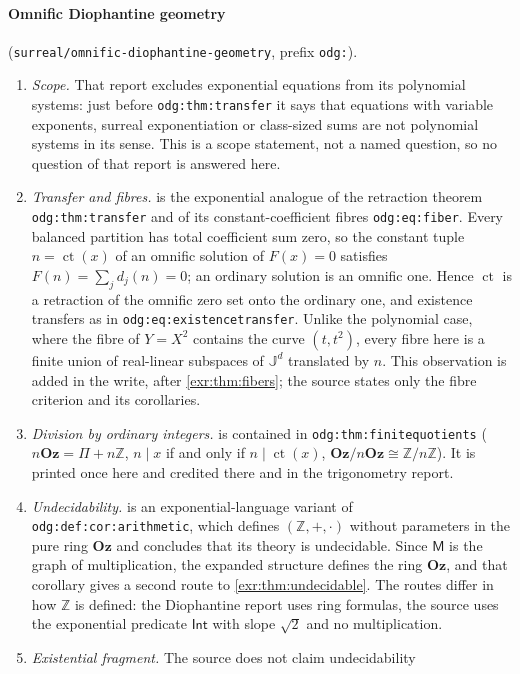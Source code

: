 \documentclass[11pt,letterpaper]{article}
\numberwithin{equation}{section}
\theoremstyle{definition}
\theoremstyle{remark}
\newcommand{\Oz}{\mathbf{Oz}}
\newcommand{\Z}{\mathbb Z}
\newcommand{\J}{\mathbb J}
\newcommand{\ct}{\operatorname{ct}}
\newcommand{\Int}{\mathsf{Int}}
\newcommand{\rpath}[1]{\nolinkurl{#1}}%
\newcommand{\lbl}[1]{\nolinkurl{#1}}%
\begin{document}
\paragraph{Omnific Diophantine geometry}
(\rpath{surreal/omnific-diophantine-geometry}, prefix \texttt{odg:}).
\begin{enumerate}[leftmargin=*,itemsep=3pt]
\item \emph{Scope.} That report excludes exponential equations from its
polynomial systems: just before \lbl{odg:thm:transfer} it says that equations
with variable exponents, surreal exponentiation or class-sized sums are not
polynomial systems in its sense. This is a scope statement, not a named
question, so no question of that report is answered here.
\item \emph{Transfer and fibres.}  is the exponential
analogue of the retraction theorem \lbl{odg:thm:transfer} and of its
constant-coefficient fibres \lbl{odg:eq:fiber}. Every balanced partition has
total coefficient sum zero, so the constant tuple $n=\ct(x)$ of an omnific
solution of $F(x)=0$ satisfies $F(n)=\sum_jd_j(n)=0$; an ordinary solution is
an omnific one. Hence $\ct$ is a retraction of the omnific zero set onto the
ordinary one, and existence transfers as in \lbl{odg:eq:existencetransfer}.
Unlike the polynomial case, where the fibre of $Y=X^2$ contains the curve
$(t,t^2)$, every fibre here is a finite union of real-linear subspaces of
$\J^d$ translated by $n$. This observation is added in the write, after
\cref{exr:thm:fibers}; the source states only the fibre criterion and its
corollaries.
\item \emph{Division by ordinary integers.}  is
contained in \lbl{odg:thm:finitequotients} ($n\Oz=\Pi+n\Z$, $n\mid x$ if and
only if $n\mid\ct(x)$, $\Oz/n\Oz\cong\Z/n\Z$). It is printed once here and
credited there and in the trigonometry report.
\item \emph{Undecidability.}  is an
exponential-language variant of \lbl{odg:def:cor:arithmetic}, which defines
$(\Z,+,\cdot)$ without parameters in the pure ring $\Oz$ and concludes that its
theory is undecidable. Since $\mathsf M$ is the graph of multiplication, the
expanded structure defines the ring $\Oz$, and that corollary gives a second
route to \cref{exr:thm:undecidable}. The routes differ in how $\Z$ is
defined: the Diophantine report uses ring formulas, the source uses the
exponential predicate $\Int$ with slope $\sqrt2$ and no multiplication.
\item \emph{Existential fragment.} The source does not claim undecidability

\end{enumerate}
\end{document}
